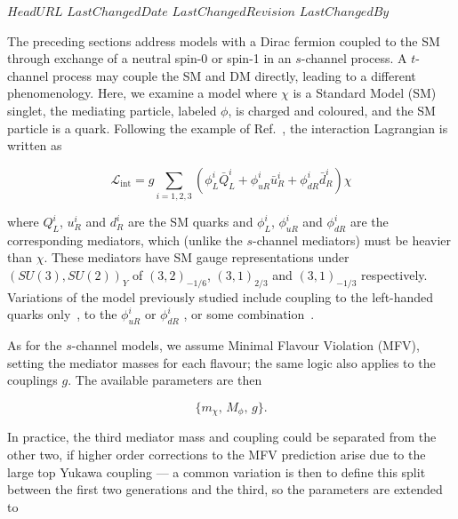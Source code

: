 \svnidlong
{$HeadURL$}
{$LastChangedDate$}
{$LastChangedRevision$}
{$LastChangedBy$}


The preceding sections address models
with a Dirac fermion coupled to the SM through exchange of a
neutral spin-0 or spin-1 in an $s$-channel process.
A $t$-channel process may couple the SM and DM directly,
leading to a different phenomenology.
Here, we examine a model where $\chi$ is a Standard Model (SM) singlet,
the mediating particle, labeled $\phi$, is charged and coloured, and
the SM particle is a quark.
Following the example of Ref.~\cite{Papucci:2014iwa}, the interaction Lagrangian is written as

\begin{equation}
\mathcal{L}_{\mathrm{int}} = g \sum_{i=1,2,3} (\phi_L^i \bar{Q}_L^i + \phi_{uR}^i \bar{u}_R^i + \phi_{dR}^i \bar{d}_R^i) \chi
\end{equation}

where $Q_L^i$, $u_R^i$ and $d_R^i$ are the SM quarks and $\phi_L^i$, $\phi_{uR}^i$ and $\phi_{dR}^i$ are the corresponding mediators, which (unlike the $s$-channel mediators) must be heavier than $\chi$. These mediators have SM gauge representations under $(SU(3), SU(2))_Y$ of $(3,2)_{-1/6}$, $(3,1)_{2/3}$ and $(3,1)_{-1/3}$ respectively. Variations of the model previously studied include coupling to the left-handed quarks only~\cite{Chang:2014, Busoni:2014haa}, to the $\phi_{uR}^i$ \cite{Tait:2013} or $\phi_{dR}^i$ \cite{Papucci:2014iwa, Yavin:14092893}, or some combination~\cite{Bai:201311171, An:201489115014}.

\vspace{5mm}

As for the $s$-channel models, we assume Minimal Flavour Violation (MFV), setting the mediator masses for each flavour; the same logic also applies to the couplings $g$. The available parameters are then

\begin{equation}
\{ m_{\chi},\, M_{\phi},\, g\}.
\end{equation}

\vspace{5mm}

In practice, the third mediator mass and coupling could be separated from the other two, if higher order corrections to the MFV prediction arise due to the large top Yukawa coupling --- a common variation is then to define this split between the first two generations and the third, so the parameters are extended to

